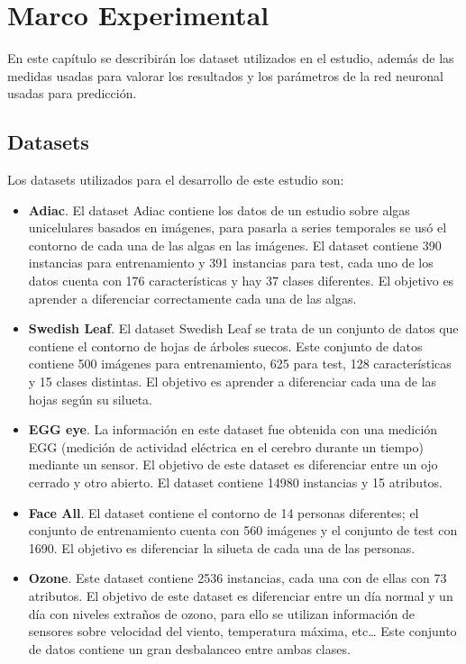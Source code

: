 \chapter{Marco Experimental}
En este capítulo se describirán los dataset utilizados en el estudio, además de las medidas usadas para valorar los resultados y los parámetros de la red neuronal usadas para predicción.\newline

\section{Datasets}
Los datasets utilizados para el desarrollo de este estudio son:\newline
\begin{itemize}
	\item \textbf{Adiac}. El dataset Adiac contiene los datos de un estudio sobre algas unicelulares basados en imágenes, para pasarla a series temporales se usó el contorno de cada una de las algas en las imágenes. El dataset contiene 390 instancias para entrenamiento y 391 instancias para test, cada uno de los datos cuenta con 176 características y hay 37 clases diferentes. El objetivo es aprender a diferenciar correctamente cada una de las algas.
	\item \textbf{Swedish Leaf}. El dataset Swedish Leaf se trata de un conjunto de datos que contiene el contorno de hojas de árboles suecos. Este conjunto de datos contiene 500 imágenes para entrenamiento, 625 para test, 128 características y 15 clases distintas. El objetivo es aprender a diferenciar cada una de las hojas según su silueta.
	\item \textbf{EGG eye}. La información en este dataset fue obtenida con una medición EGG (medición de actividad eléctrica en el cerebro durante un tiempo)  mediante un sensor. El objetivo de este dataset es diferenciar entre un ojo cerrado y otro abierto. El dataset contiene 14980 instancias y 15 atributos.
	\item \textbf{Face All}. El dataset contiene el contorno de 14 personas diferentes; el conjunto de entrenamiento cuenta con 560 imágenes y el conjunto de test con 1690. El objetivo es diferenciar la silueta de cada una de las personas.
	\item \textbf{Ozone}. Este dataset contiene 2536 instancias, cada una con de ellas con 73 atributos. El objetivo de este dataset es diferenciar entre un día normal y un día con niveles extraños de ozono, para ello se utilizan información de sensores sobre velocidad del viento, temperatura máxima, etc… Este conjunto de datos contiene un gran desbalanceo entre ambas clases.

\end{itemize}
